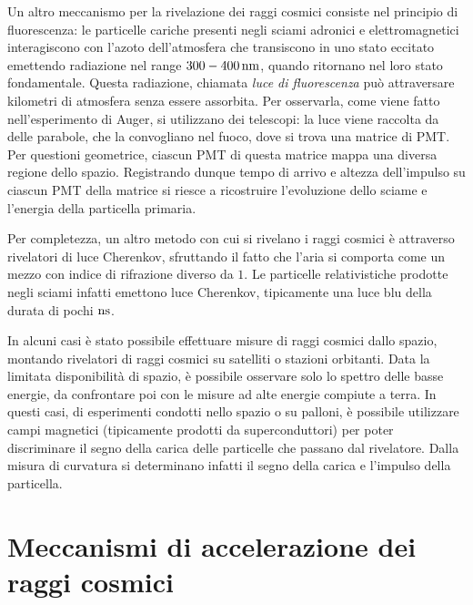 Un altro meccanismo per la rivelazione dei raggi cosmici consiste nel principio di fluorescenza: le particelle cariche presenti negli sciami adronici e elettromagnetici interagiscono con l'azoto dell'atmosfera che transiscono in uno stato eccitato emettendo radiazione nel range $300-400\,\textup{nm}$, quando ritornano nel loro stato fondamentale. Questa radiazione, chiamata \emph{luce di fluorescenza} può attraversare kilometri di atmosfera senza essere assorbita. Per osservarla, come viene fatto nell'esperimento di Auger, si utilizzano dei telescopi: la luce viene raccolta da delle parabole, che la convogliano nel fuoco, dove si trova una matrice di PMT. Per questioni geometrice, ciascun PMT di questa matrice mappa una diversa regione dello spazio. Registrando dunque tempo di arrivo e altezza dell'impulso su ciascun PMT della matrice si riesce a ricostruire l'evoluzione dello sciame e l'energia della particella primaria.

Per completezza, un altro metodo con cui si rivelano i raggi cosmici è attraverso rivelatori di luce Cherenkov, sfruttando il fatto che l'aria si comporta come un mezzo con indice di rifrazione diverso da $1$. Le particelle relativistiche prodotte negli sciami infatti emettono luce Cherenkov, tipicamente una luce blu della durata di pochi $\textup{ns}$.

In alcuni casi è stato possibile effettuare misure di raggi cosmici dallo spazio, montando rivelatori di raggi cosmici su satelliti o stazioni orbitanti. Data la limitata disponibilità di spazio, è possibile osservare solo lo spettro delle basse energie, da confrontare poi con le misure ad alte energie compiute a terra. In questi casi, di esperimenti condotti nello spazio o su palloni, è possibile utilizzare campi magnetici (tipicamente prodotti da superconduttori) per poter discriminare il segno della carica delle particelle che passano dal rivelatore. Dalla misura di curvatura si determinano infatti il segno della carica e l'impulso della particella.

\section{Meccanismi di accelerazione dei raggi cosmici}

